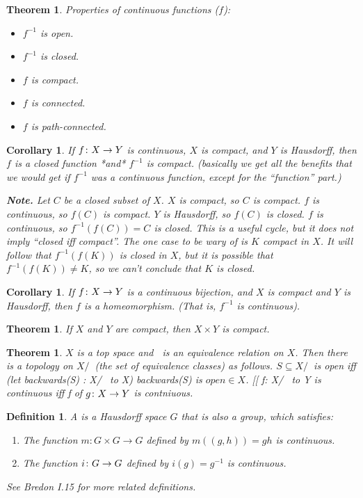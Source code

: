 \documentclass[11pt]{amsbook}
\theoremstyle{mystyle} %
\newtheorem{thrm}[thm]{Theorem}
\newtheorem{defi}[thm]{Definition}
\newtheorem{coro}[thm]{Corollary}
\numberwithin{thm}{section}
\begin{document}
\begin{thrm}
	Properties of continuous functions ($f$):
	\begin{itemize}
		\item $f^{-1}$ is open.
		\item $f^{-1}$ is closed.
		\item $f$ is compact.
		\item $f$ is connected.
		\item $f$ is path-connected.
	\end{itemize}
\end{thrm}
\begin{coro}
	If $f \colon X \to Y$ is continuous, $X$ is compact, and $Y$ is Hausdorff, then $f$ is a closed function *and* $f^{-1}$ is compact.  (basically we get all the benefits that we would get if $f^{-1}$ was a continuous function, except for the ``function'' part.)

	\textbf{Note.} Let $C$ be a closed subset of $X$.  $X$ is compact, so $C$ is compact.  $f$ is continuous, so $f(C)$ is compact.  $Y$ is Hausdorff, so $f(C)$ is closed.  $f$ is continuous, so $f^{-1}(f(C)) = C$ is closed.  This is a useful cycle, but it does not imply ``closed iff compact''.  The one case to be wary of is $K$ compact in $X$.  It will follow that $f^{-1}(f(K))$ is closed in $X$, but it is possible that $f^{-1}(f(K)) \neq K$, so we can't conclude that $K$ is closed.
\end{coro}
\begin{coro}
	If $f \colon X \to Y$ is a continuous bijection, and $X$ is compact and $Y$ is Hausdorff, then $f$ is a homeomorphism. (That is, $f^{-1}$ is continuous).
\end{coro}
\begin{thrm}
	If $X$ and $Y$ are compact, then $X \times Y$ is compact.
\end{thrm}
\begin{thrm}
	$X$ is a top space and $~$ is an equivalence relation on $X$.  Then there is a topology on $X/~$ (the set of equivalence classes) as follows.  $S \subseteq X/~$ is open iff (let backwards(S) : X/~ to X) backwards(S) is $open \in X$.  [[ f: X/~ to Y is continuous iff f of $g\colon X \to Y$ is contniuous.
\end{thrm}
\begin{defi}
	A  is a Hausdorff space $G$ that is also a group, which satisfies:
	\begin{enumerate}
		\item The function $m : G \times G \to G$ defined by $m((g,h)) = gh$ is continuous.
		\item The function $i \colon G \to G$ defined by $i(g) = g^{-1}$ is continuous.
	\end{enumerate}
	See Bredon I.15 for more related definitions.
\end{defi}
\end{document}
